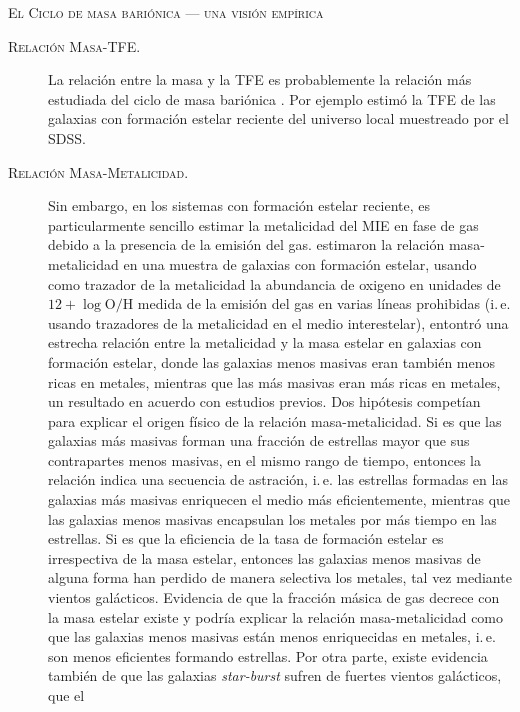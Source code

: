 \documentclass[xcolor=dvipsnames,4pt,hyperref={colorlinks,citecolor=black,linkcolor=black,urlcolor=black}]{beamer}
\begin{document}
\begin{frame}[allowframebreaks]{\textsc{El Ciclo de masa bariónica --- una visión empírica}}
\begin{description}
%
\item[\textsc{Relación Masa-TFE.}] La relación entre la masa y la TFE es probablemente la relación
más estudiada del ciclo de masa bariónica \citep[e.\,g.][]{Schmidt1959, Kennicutt1998}. Por ejemplo
\citet{Brinchmann2004} estimó la TFE de las galaxias con formación estelar reciente del universo
local muestreado por el SDSS.
%
\item[\textsc{Relación Masa-Metalicidad.}] Sin embargo, en los sistemas con formación estelar
reciente, es particularmente sencillo estimar la metalicidad del MIE en fase de gas debido a la
presencia de la emisión del gas. \citet{Tremonti2004} estimaron la relación masa-metalicidad en una
muestra de galaxias con formación estelar, usando como trazador de la metalicidad la abundancia de
oxigeno en unidades de $12+\log{\text{O}/\text{H}}$ medida de la emisión del gas en varias líneas
prohibidas (i.\,e. usando trazadores de la metalicidad en el medio interestelar), entontró una
estrecha relación entre la metalicidad y la masa estelar en galaxias con formación estelar, donde
las galaxias menos masivas eran también menos ricas en metales, mientras que las más masivas eran
más ricas en metales, un resultado en acuerdo con estudios previos.
Dos hipótesis competían para explicar el origen físico de la relación masa-metalicidad. Si es que
las galaxias más masivas forman una fracción de estrellas mayor que sus contrapartes menos masivas,
en el mismo rango de tiempo, entonces la relación indica una secuencia de astración, i.\,e. las
estrellas formadas en las galaxias más masivas enriquecen el medio más eficientemente, mientras que
las galaxias menos masivas encapsulan los metales por más tiempo en las estrellas. Si es que la
eficiencia de la tasa de formación estelar es irrespectiva de la masa estelar, entonces las galaxias
menos masivas de alguna forma han perdido de manera selectiva los metales, tal vez mediante vientos
galácticos.
Evidencia de que la fracción másica de gas decrece con la masa estelar existe \citep{Bell2000} y
podría explicar la relación masa-metalicidad como que las galaxias menos masivas están menos
enriquecidas en metales, i.\,e. son menos eficientes formando estrellas. Por otra parte, existe
evidencia también de que las galaxias \emph{star-burst} sufren de fuertes vientos galácticos, que el

\end{description}
\end{frame}
\end{document}
